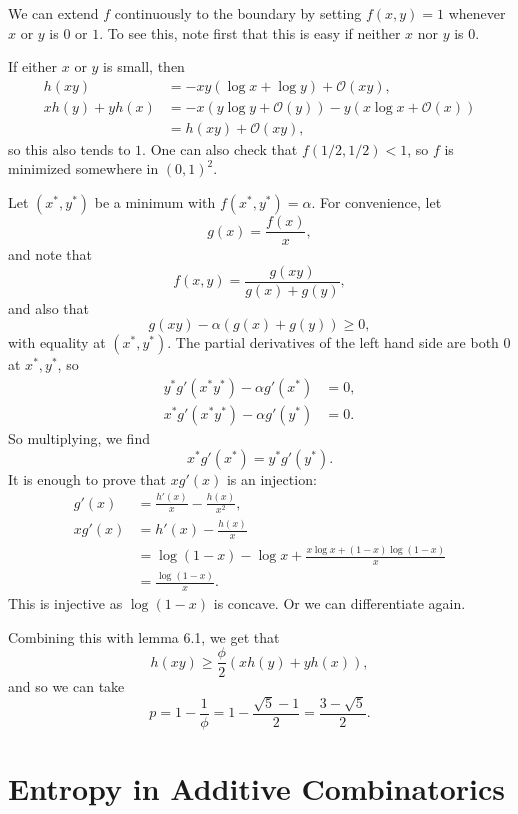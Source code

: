 \documentclass[12pt]{article}
\begin{document}
\begin{proofbox}
	We can extend $f$ continuously to the boundary by setting $f(x, y) = 1$ whenever $x$ or $y$ is $0$ or $1$. To see this, note first that this is easy if neither $x$ nor $y$ is $0$.

	If either $x$ or $y$ is small, then
	\begin{align*}
		h(xy) &= - xy (\log x + \log y) + \mathcal{O}(xy), \\
		xh(y) + yh(x) &= - x(y \log y + \mathcal{O}(y)) - y (x \log x + \mathcal{O}(x)) \\
			      &= h(xy) + \mathcal{O}(xy),
	\end{align*}
	so this also tends to $1$. One can also check that $f(1/2, 1/2) < 1$, so $f$ is minimized somewhere in $(0, 1)^2$.

	Let $(x^{\ast}, y^{\ast})$ be a minimum with $f(x^{\ast}, y^{\ast}) = \alpha$. For convenience, let
	\[
	g(x) = \frac{f(x)}{x},
	\]
	and note that
	\[
	f(x, y) = \frac{g(xy)}{g(x) + g(y)},
	\]
	and also that
	\[
	g(xy) - \alpha (g(x) + g(y)) \geq 0,
	\]
	with equality at $(x^{\ast}, y^{\ast})$. The partial derivatives of the left hand side are both $0$ at $x^{\ast}, y^{\ast}$, so
	\begin{align*}
		y^{\ast} g'(x^{\ast} y^{\ast}) - \alpha g'(x^{\ast}) &= 0, \\
		x^{\ast} g'(x^{\ast} y^{\ast}) - \alpha g'(y^{\ast}) &= 0.
	\end{align*}
	So multiplying, we find
	\[
	x^{\ast} g'(x^{\ast}) = y^{\ast} g'(y^{\ast}).
	\]
	It is enough to prove that $x g'(x)$ is an injection:
	\begin{align*}
		g'(x) &= \frac{h'(x)}{x} - \frac{h(x)}{x^2}, \\
		x g'(x) &= h'(x) - \frac{h(x)}{x} \\
			&= \log(1 - x) - \log x + \frac{x \log x + (1 - x) \log (1 - x)}{x} \\
			&= \frac{\log(1 - x)}{x}.
	\end{align*}
	This is injective as $\log(1 - x)$ is concave. Or we can differentiate again.
\end{proofbox}

Combining this with lemma 6.1, we get that
\[
h(xy) \geq \frac{\phi}{2} (x h(y) + y h(x)),
\]
and so we can take
\[
p = 1 - \frac 1 \phi = 1 - \frac{\sqrt 5 - 1}{2} = \frac{3 - \sqrt 5}{2}.
\]
\newpage

\section{Entropy in Additive Combinatorics}%
\label{sec:eac}
\end{document}
